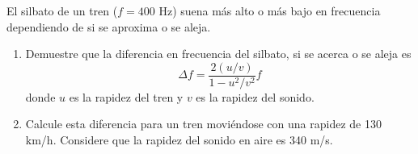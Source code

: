 \item El silbato de un tren ($f = 400\text{ Hz}$) suena más alto o más bajo en frecuencia dependiendo de si se aproxima o se aleja.
\begin{enumerate}
    \item Demuestre que la diferencia en frecuencia del silbato, si se acerca o se aleja es
$$ \Delta f = \frac{2(u/v)}{1 - u^2/v^2} f $$
donde $u$ es la rapidez del tren y $v$ es la rapidez del sonido.
    \item Calcule esta diferencia para un tren moviéndose con una rapidez de 130 km/h. Considere que la rapidez del sonido en aire es 340 m/s.
\end{enumerate}